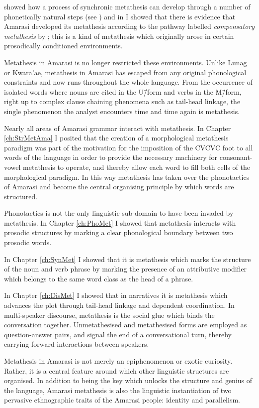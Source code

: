 \cite{blga98} showed how a process of synchronic metathesis
can develop through a number of phonetically natural steps (see )
and in  I showed that there is evidence
that Amarasi developed its metathesis according to the pathway labelled \emph{compensatory metathesis} by \cite{blga98};
this is a kind of metathesis which originally arose in certain prosodically conditioned environments.

Metathesis in Amarasi is no longer restricted these environments.
Unlike Lunag or Kwara'ae, metathesis in Amarasi has
escaped from any original phonological constraints
and now runs throughout the whole language.
From the occurrence of isolated words
where nouns are cited in the U\=/form and verbs in the M\=/form,
right up to complex clause chaining phenomena such as tail-head linkage,
the single phenomenon the analyst encounters time and time again is metathesis.

Nearly all areas of Amarasi grammar interact with metathesis.
In Chapter \ref{ch:StrMetAma} I posited that the creation of a morphological metathesis paradigm
was part of the motivation for the imposition of the CVCVC foot to all words of the language
in order to provide the necessary machinery for consonant-vowel metathesis to operate,
and thereby allow each word to fill both cells of the morphological paradigm.
In this way metathesis has taken over the phonotactics of Amarasi
and become the central organising principle by which words are structured.

Phonotactics is not the only linguistic sub-domain to have been invaded by metathesis.
In Chapter \ref{ch:PhoMet} I showed that metathesis
interacts with prosodic structures by marking a clear
phonological boundary between two prosodic words.

In Chapter \ref{ch:SynMet} I showed that
it is metathesis which marks the structure of the noun and verb phrase
by marking the presence of an attributive modifier
which belongs to the same word class as the head of a phrase.

In Chapter \ref{ch:DisMet} I showed that in narratives
it is metathesis which advances the plot through tail-head linkage
and dependent coordination.
In multi-speaker discourse,
metathesis is the social glue which binds the conversation together.
Unmetathesised and metathesised forms are employed as question-answer pairs,
and signal the end of a conversational turn,
thereby carrying forward interactions between speakers.

Metathesis in Amarasi is not merely
an epiphenomenon or exotic curiosity.
Rather, it is a central feature around which other linguistic structures are organised.
In addition to being the key which unlocks the structure and genius
of the language, Amarasi metathesis is also the linguistic instantiation of two pervasive
ethnographic traits of the Amarasi people: identity and parallelism.